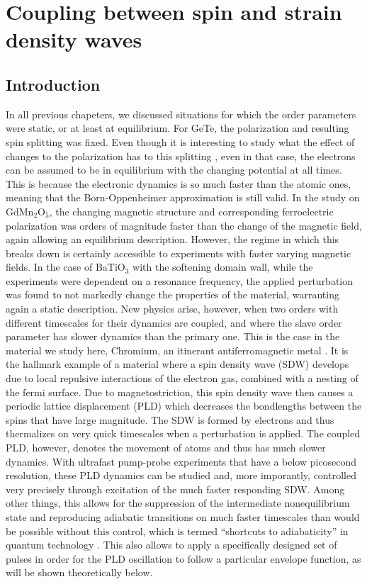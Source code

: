 \chapter{Coupling between spin and strain density waves \label{ch:CrSDW}}
\section{Introduction}
In all previous chapeters, we discussed situations for which the order parameters were static, or at least at equilibrium.
For GeTe, the polarization and resulting spin splitting was fixed. Even though it is interesting to study what the effect of changes to the polarization has to this splitting \cite{Monserrat2017}, even in that case, the electrons can be assumed to be in equilibrium with the changing potential at all times.
This is because the electronic dynamics is so much faster than the atomic ones, meaning that the Born-Oppenheimer approximation is still valid.
In the study on GdMn$_2$O$_5$, the changing magnetic structure and corresponding ferroelectric polarization was orders of magnitude faster than the change of the magnetic field, again allowing an equilibrium description.
However, the regime in which this breaks down is certainly accessible to experiments with faster varying magnetic fields.
In the case of BaTiO$_3$ with the softening domain wall, while the experiments were dependent on a resonance frequency, the applied perturbation was found to not markedly change the properties of the material, warranting again a static description.
New physics arise, however, when two orders with different timescales for their dynamics are coupled, and where the slave order parameter has slower dynamics than the primary one.
This is the case in the material we study here, Chromium, an itinerant antiferromagnetic metal \cite{Kulikov1984,Fawcett1988}.
It is the hallmark example of a material where a spin density wave (SDW) develops due to local repulsive interactions of the electron gas, combined with a nesting of the fermi surface.
Due to magnetostriction, this spin density wave then causes a periodic lattice displacement (PLD) which decreases the bondlengths between the spins that have large magnitude.
The SDW is formed by electrons and thus thermalizes on very quick timescales when a perturbation is applied\cite{Nicholson2016}.
The coupled PLD, however, denotes the movement of atoms and thus has much slower dynamics.
With ultrafast pump-probe experiments that have a below picosecond resolution, these PLD dynamics can be studied and, more imporantly, controlled very precisely through excitation of the much faster responding SDW.
Among other things, this allows for the suppression of the intermediate nonequilibrium state and reproducing adiabatic transitions on much faster timescales than would be possible without this control, which is termed ``shortcuts to adiabaticity'' in quantum technology \cite{Torrontegui2013,Deffner2014,Zhou2017}.
This also allows to apply a specifically designed set of pulses in order for the PLD oscillation to follow a particular envelope function, as will be shown theoretically below.

